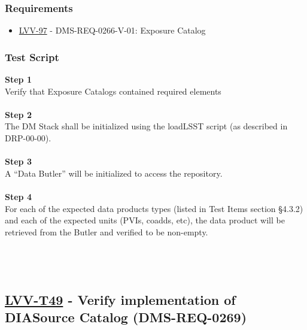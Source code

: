 \hypertarget{requirements-25}{%
\subsubsection{Requirements}\label{requirements-25}}

\begin{itemize}
\tightlist
\item
  \href{https://jira.lsstcorp.org/browse/LVV-97}{LVV-97} -
  DMS-REQ-0266-V-01: Exposure Catalog
\end{itemize}

\hypertarget{test-script-25}{%
\subsubsection{Test Script}\label{test-script-25}}

\textbf{Step 1}\\
Verify that Exposure Catalogs contained required elements\\
~\\
\textbf{Step 2}\\
The DM Stack shall be initialized using the loadLSST script (as
described in DRP-00-00).\\
~\\
\textbf{Step 3}\\
A ``Data Butler'' will be initialized to access the repository.\\
~\\
\textbf{Step 4}\\
For each of the expected data products types (listed in Test Items
section §4.3.2) and each of the expected units (PVIs, coadds, etc), the
data product will be retrieved from the Butler and verified to be
non-empty.\\
~\\
~\\
~\\

\hypertarget{lvv-t49---verify-implementation-of-diasource-catalog-dms-req-0269}{%
\subsection{\texorpdfstring{\href{https://jira.lsstcorp.org/secure/Tests.jspa\#/testCase/LVV-T49}{LVV-T49}
- Verify implementation of DIASource Catalog
(DMS-REQ-0269)}{LVV-T49 - Verify implementation of DIASource Catalog (DMS-REQ-0269)}}\label{lvv-t49---verify-implementation-of-diasource-catalog-dms-req-0269}}

